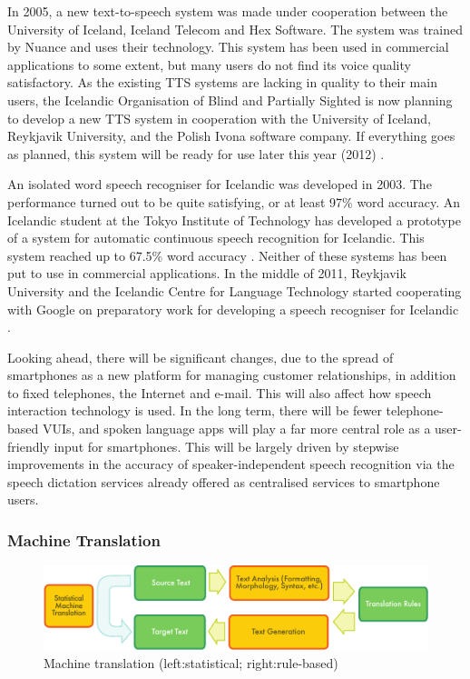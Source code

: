 \begin{multicols}{2}
In 2005, a new text-to-speech system was made under cooperation between the University of Iceland, Iceland Telecom and Hex Software. The system was trained by Nuance and uses their technology. This system has been used in commercial applications to some extent, but many users do not find its voice quality satisfactory. As the existing TTS systems are lacking in quality to their main users, the Icelandic Organisation of Blind and Partially Sighted is now planning to develop a new TTS system in cooperation with the University of Iceland, Reykjavik University, and the Polish Ivona software company. If everything goes as planned, this system will be ready for use later this year (2012) \cite{tal1}. 

An isolated word speech recogniser for Icelandic was developed in 2003. The performance turned out to be quite satisfying, or at least 97\% word accuracy. An Icelandic student at the Tokyo Institute of Technology has developed a prototype of a system for automatic continuous speech recognition for Icelandic. This system reached up to 67.5\% word accuracy \cite{hind1}. Neither of these systems has been put to use in commercial applications. In the middle of 2011, Reykjavik University and the Icelandic Centre for Language Technology started cooperating with Google on preparatory work for developing a speech recogniser for Icelandic \cite{alm1}.

Looking ahead, there will be significant changes, due to the spread of smartphones as a new platform for managing customer relationships, in addition to fixed telephones, the Internet and e-mail. This will also affect how speech interaction technology is used. In the long term, there will be fewer telephone-based VUIs, and spoken language apps will play a far more central role as a user-friendly input for smartphones. This will be largely driven by stepwise improvements in the accuracy of speaker-independent speech recognition via the speech dictation services already offered as centralised services to smartphone users.

\subsubsection{Machine Translation}

\begin{figure}[htb]
  \center
  \includegraphics[width=\textwidth]{../_media/english/machine_translation}
  \caption{Machine translation (left:statistical; right:rule-based)}
\label{fig:mtarch_en}
\end{figure}


\end{multicols}
